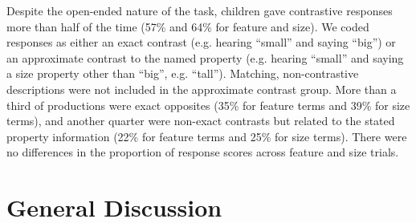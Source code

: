 \documentclass[man]{apa2}
\begin{document}
Despite the open-ended nature of the task, children gave contrastive responses more than half of the time (57\% and 64\% for feature and size).  We coded responses as either an exact contrast (e.g. hearing ``small'' and saying ``big'') or an approximate contrast to the named property (e.g. hearing ``small'' and saying a size property other than ``big'', e.g. ``tall''). Matching, non-contrastive descriptions were not included in the approximate contrast group. More than a third of productions were exact opposites (35\% for feature terms and 39\% for size terms), and another quarter were non-exact contrasts but related to the stated property information (22\% for feature terms and 25\% for size terms). There were no differences in the proportion of response scores across feature and size trials.



\section{General Discussion}
\end{document}
